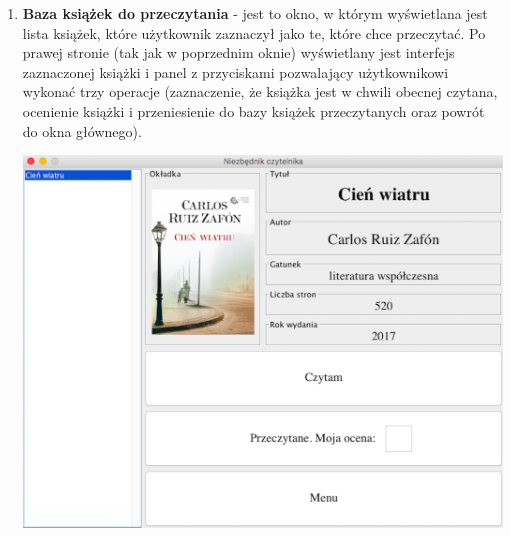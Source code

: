 \documentclass[a4paper,10pt]{article}
\begin{document}
\begin{enumerate}
\item \textbf{Baza książek do przeczytania} - jest to okno, w którym wyświetlana jest lista książek, które użytkownik zaznaczył jako te, które chce przeczytać. Po prawej stronie (tak jak w poprzednim oknie) wyświetlany jest interfejs zaznaczonej książki i panel z przyciskami pozwalający użytkownikowi wykonać trzy operacje (zaznaczenie, że książka jest w chwili obecnej czytana, ocenienie książki i przeniesienie do bazy książek przeczytanych oraz powrót do okna głównego).
\begin{center}
\includegraphics[scale=0.18]{BazaDoPrzeczytania.png}
\end{center}


\end{enumerate}
\end{document}
